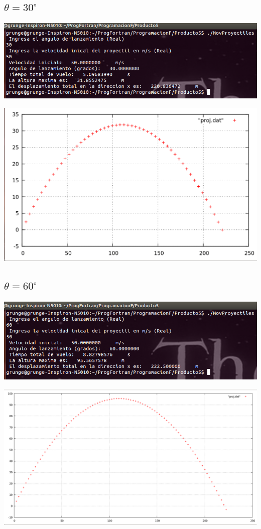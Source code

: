 \documentclass[notitlepage,12pt]{article}
\begin{document}
\subsection{$\theta=30^{\circ}$}
\includegraphics[scale=0.5]{teta_30}

\includegraphics[scale=0.3]{grafica_teta_30}


\subsection{$\theta=60^{\circ}$}
\includegraphics[scale=0.5]{teta_60}

\includegraphics[scale=0.3]{grafica_teta_60}
\end{document}
